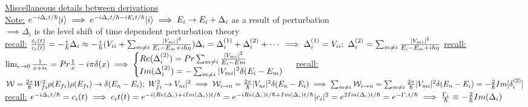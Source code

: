 \documentclass[12pt]{amsart}
\begin{document}
\begin{enumerate}
\underline{Miscellaneous details between derivations}\\
\underline{Note:} $e^{-i \Delta_i t/\hbar} |i \rangle \implies e^{- i \Delta_i t/\hbar - i E_i t/\hbar} |i \rangle\\
\implies E_i \rightarrow E_i + \Delta_i$ as a result of perturbation\\
$\implies \Delta_i$ is the level shift of time dependent perturbation theory\\
\underline{recall:} $\frac{\dot{c}_i(t)}{c_i(t)} = - \frac{i}{\hbar} \Delta_i \approx - \frac{i}{\hbar}(V_{ii} + \sum_{m \neq i} \frac{| V_{mi}|^2}{E_i - E_m + i \hbar \eta})\\
\Delta_i = \Delta_i^{(1)} + \Delta_i^{(2)} + \cdots\\
\implies \Delta_i^{(1)} = V_{ii};\,\, \Delta_i^{(2)} = \sum_{m \neq i} \frac{|V_{mi}|^2}{E_i - E_m + i \hbar \eta}\\$
\underline{recall:} $\lim_{\epsilon \rightarrow 0} \frac{1}{x+ i \epsilon} = Pr \frac{1}{x}- i \pi \delta(x)\\
\implies \begin{cases} Re(\Delta_i^{(2)}) = Pr \sum_{m \neq i} \frac{|V_{mi}|^2}{E_i - Em}\\
Im(\Delta_i^{(2)}) = - \sum_{m \neq i} | V_{mi}|^2 \delta(E_i - E_m)
\end{cases}$
\underline{recall:} $\mathcal{W} = \frac{2 \pi}{\hbar} W_{fi}^2 \rho(E_{fi})\\
\rho(E_{fi}) \rightarrow \delta(E_n - E_i);\,\, W_{fi}^2 \rightarrow V_{ni}|^2\\
\implies \mathcal{W}_{i \rightarrow n} = \frac{2 \pi}{\hbar} |V_{ni}|^2 \delta(E_n - E_i)\\
\implies \sum_{m \neq i} \mathcal{W}_{i \rightarrow n} = \sum_{m \neq i} \frac{2 \pi}{\hbar} |V_{mi}|^2 \delta(E_n - E_i) = - \frac{2}{\hbar} Im[\delta_i^{(2)}]\\$
\underline{recall:} $e^{- i\Delta_it/\hbar} = c_i(t)\\
\implies c_it(t) = e^{- i ( Re(\Delta_i) + i Im(\Delta_i))t/\hbar} = e^{- i Re(\Delta_i) t/\hbar +Im(\Delta_i)t/\hbar}\\
|c_i|^2 = e^{2 Im(\Delta_i) t/\hbar} = e^{- \Gamma_it/\hbar}\\
\implies \frac{\Gamma_i}{\hbar} \equiv - \frac{2}{\hbar} Im(\Delta_i)$


\hdashrule[0.5ex][c]{\linewidth}{0.5pt}{1.5mm}



\end{enumerate}
\end{document}
